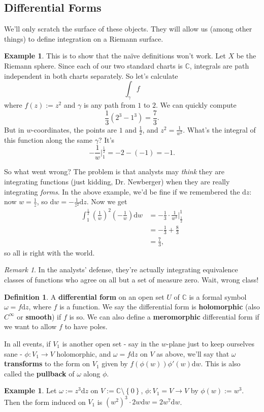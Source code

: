 \documentclass[12pt]{article}
\newcommand{\cx}{\mathbb{C}}
\newcommand{\ita}[1]{\textit{#1}}
\newcommand\setb[1]{\left \{ #1 \right \}}
\newcommand{\paren}[1]{\left( #1 \right)}
\theoremstyle{definition}
\newtheorem{definition}[theorem]{Definition}
\newtheorem{example}[theorem]{Example}
\theoremstyle{remark}
\newtheorem*{remark}{Remark}
\begin{document}
\subsection{Differential Forms}
We'll only scratch the surface of these objects. They will allow us (among other things) to define integration on a Riemann surface.
\begin{example}
    This is to show that the na\"ive definitions won't work. Let $X$ be the Riemann sphere. Since each of our two standard charts is $\cx$, integrals are path independent in both charts separately. So let's calculate
    \[
        \int_{\gamma} f
    \]
    where $f(z) := z^2$ and $\gamma$ is any path from $1$ to $2$. We can quickly compute
    \[
        \frac{1}{3} \paren{ 2^3 - 1^3 } = \frac{7}{3}.
    \]
    But in $w$-coordinates, the points are $1$ and $\frac{1}{2}$, and $z^2 = \frac{1}{w^2}$. What's the integral of this function along the same $\gamma$? It's
    \[
        -\frac{1}{w} \Big|_1^{\frac{1}{2}} = -2 - (-1) = -1.
    \]
\end{example}
So what went wrong? The problem is that analysts may \ita{think} they are integrating functions (just kidding, Dr. Newberger) when they are really integrating \ita{forms}. In the above example, we'd be fine if we remembered the $\mathrm{d}z$: now $w = \frac{1}{z}$, so $\mathrm{d}w = -\frac{1}{z^2} \mathrm{d}z$. Now we get
\begin{align*}
    \int_1^{\frac{1}{2}} \paren{ \frac{1}{w} }^2 \paren{ -\frac{1}{w} } \mathrm{d}w & = -\frac{1}{3} \cdot \frac{1}{w^3} \Big|_{\frac{1}{2}}^1 \\
    & = -\frac{1}{3} + \frac{8}{3} \\
    & = \frac{7}{3},
\end{align*}
so all is right with the world.
\begin{remark}
    In the analysts' defense, they're actually integrating equivalence classes of functions who agree on all but a set of measure zero. Wait, wrong class!
\end{remark}
\begin{definition}
    A \textbf{differential form} on an open set $U$ of $\cx$ is a formal symbol $\omega = f \mathrm{d}z$, where $f$ is a function. We say the differential form is \textbf{holomorphic} (also $C^{\infty}$ or \textbf{smooth}) if $f$ is so. We can also define a \textbf{meromorphic} differential form if we want to allow $f$ to have poles.
\end{definition}
In all events, if $V_1$ is another open set - say in the $w$-plane just to keep ourselves sane - $\phi : V_1 \to V$ holomorphic, and $\omega = f \mathrm{d}z$ on $V$ as above, we'll say that $\omega$ \textbf{transforms} to the form on $V_1$ given by $f \paren{ \phi(w) } \phi'(w) \mathrm{d}w$. This is also called the \textbf{pullback} of $\omega$ along $\phi$.
\begin{example}
    Let $\omega := z^3 \mathrm{d}z$ on $V := \cx \setminus \setb{ 0 }$, $\phi : V_1 = V \to V$ by $\phi(w) := w^3$. Then the form induced on $V_1$ is $\paren{w^2}^3 \cdot 2w \mathrm{d}w = 2w^7 \mathrm{d}w$.
\end{example}
\end{document}
